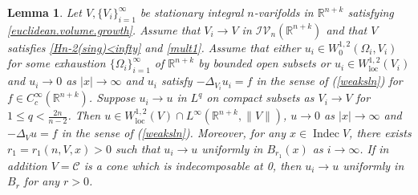 \documentclass[11pt]{amsart}
\newtheorem{lemma}[theorem]{Lemma}
\theoremstyle{definition}
\newcommand{\R}{\mathbb{R}}
\newcommand{\C}{\mathcal{C}}
\newcommand{\IV}{\mathcal{IV}}
\newcommand{\loc}{\mathrm{loc}}
\DeclareMathOperator{\indec}{Indec}
\begin{document}
\begin{lemma}\label{convergence.solution.poisson.equation}
	Let $V,\{V_i\}_{i=1}^\infty$ be stationary integral $n$-varifolds in $\R^{n+k}$ satisfying \eqref{euclidean.volume.growth}. Assume that $V_i \to V$ in $\IV_n(\R^{n+k})$ and that $V$ satisfies \eqref{Hn-2(sing)<infty} and \eqref{mult1}. Assume that either $u_i\in W_0^{1,2}( \Omega_i,V_i)$ for some exhaustion $\{\Omega_i\}_{i=1}^{\infty}$ of $\R^{n+k}$ by bounded open subsets or $u_i\in W_\loc^{1,2}(V_i)$ and $u_i\to0$ as $|x|\to\infty$ and $u_i$  satisfy $-\Delta_{V_i} u_i=f$ in the sense of (\ref{weaksln}) for $f\in C_c^{\infty}(\R^{n+k})$. Suppose $u_i\to u$ in $L^{q}$ on compact subsets as $V_i\to V$ for $1\le q<\frac{2n}{n-2}$. Then $u\in W^{1,2}_\loc(V)\cap L^\infty(\R^{n+k},\|V\|)$, $u\to0$ as $|x|\to\infty$ and $-\Delta_V u=f$ in the sense of (\ref{weaksln}). Moreover, for any $x\in \indec V$, there exists $r_1=r_1(n,V,x)>0$ such that $u_i\to u$ uniformly in $B_{r_1}(x)$ as $i\to\infty$. If in addition $V=\C$ is a cone which is indecomposable at 0, then $u_i\to u$ uniformly in $B_{r}$ for any $r>0$.
\end{lemma}
\end{document}
